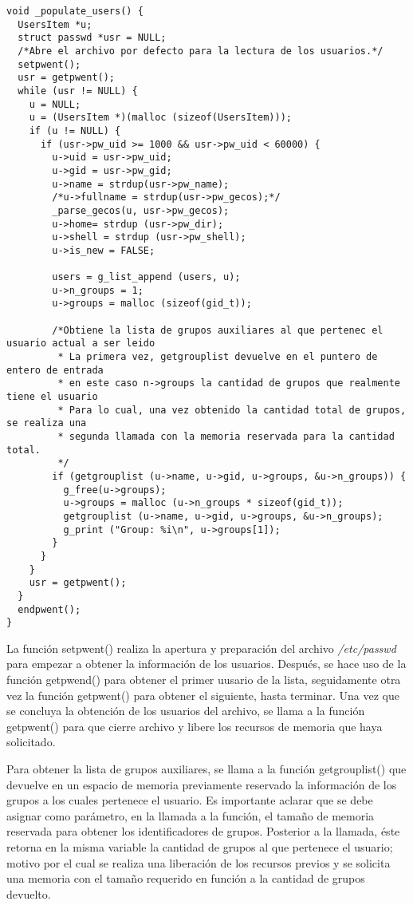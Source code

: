 \documentclass[letterpaper,10pt]{article}
\begin{document}
\begin{verbatim}
void _populate_users() {
  UsersItem *u;
  struct passwd *usr = NULL;
  /*Abre el archivo por defecto para la lectura de los usuarios.*/
  setpwent();
  usr = getpwent();
  while (usr != NULL) {
    u = NULL;
    u = (UsersItem *)(malloc (sizeof(UsersItem)));
    if (u != NULL) {
      if (usr->pw_uid >= 1000 && usr->pw_uid < 60000) {
        u->uid = usr->pw_uid;
        u->gid = usr->pw_gid;
        u->name = strdup(usr->pw_name);
        /*u->fullname = strdup(usr->pw_gecos);*/
        _parse_gecos(u, usr->pw_gecos);
        u->home= strdup (usr->pw_dir);
        u->shell = strdup (usr->pw_shell);
        u->is_new = FALSE;

        users = g_list_append (users, u);
        u->n_groups = 1;
        u->groups = malloc (sizeof(gid_t));
        
        /*Obtiene la lista de grupos auxiliares al que pertenec el usuario actual a ser leido
         * La primera vez, getgrouplist devuelve en el puntero de entero de entrada
         * en este caso n->groups la cantidad de grupos que realmente tiene el usuario
         * Para lo cual, una vez obtenido la cantidad total de grupos, se realiza una
         * segunda llamada con la memoria reservada para la cantidad total.
         */
        if (getgrouplist (u->name, u->gid, u->groups, &u->n_groups)) {
          g_free(u->groups);
          u->groups = malloc (u->n_groups * sizeof(gid_t));
          getgrouplist (u->name, u->gid, u->groups, &u->n_groups);
          g_print ("Group: %i\n", u->groups[1]);
        }
      }
    }
    usr = getpwent();
  }
  endpwent();
}
\end{verbatim}
La función setpwent() realiza la apertura y preparación del archivo \emph{/etc/passwd} 
para empezar a obtener la información de los usuarios. Después, se hace uso de la 
función getpwend() para obtener el primer uusario de la lista, seguidamente otra vez 
la función getpwent() para obtener el siguiente, hasta terminar. Una vez que se concluya
la obtención de los usuarios del archivo, se llama a la función getpwent() para que 
cierre archivo y libere los recursos de memoria que haya solicitado.

Para obtener la lista de grupos auxiliares, se llama a la función getgrouplist() que
devuelve en un espacio de memoria previamente reservado la información de los grupos a los
cuales pertenece el usuario.
Es importante aclarar que se debe asignar como parámetro, en la llamada a la función, el 
tamaño de memoria reservada para obtener los identificadores de grupos.
Posterior a la llamada, éste retorna en la misma variable la cantidad de grupos al que 
pertenece el usuario; motivo por el cual se realiza una liberación de los recursos
previos y se solicita una memoria con el tamaño requerido en función a la cantidad
de grupos devuelto.
\end{document}
